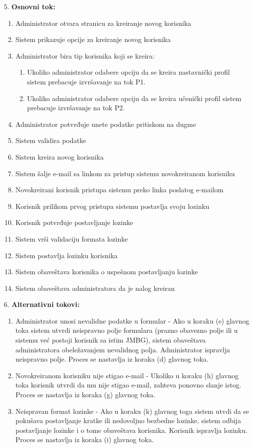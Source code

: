\documentclass{article}
\begin{document}
5. \textbf{Osnovni tok:} 
\begin{enumerate} [label=(\alph*)]
\item Administrator otvara stranicu za kreiranje novog korisnika
\item Sistem prikazuje opcije za kreiranje novog korisnika
\item Administrator bira tip korisnika koji se kreira:
\begin{enumerate} [label=(\roman*)]
    \item Ukoliko administrator odabere opciju da se kreira nastavnički profil sistem prebacuje izvršavanje na tok P1.
    \item Ukoliko administrator odabere opciju da se kreira učenički profil sistem prebacuje izvršavanje na tok P2.
\end{enumerate}
\item Administrator potvrđuje unete podatke pritiskom na dugme
\item Sistem validira podatke
\item Sistem kreira novog korisnika
\item Sistem šalje e-mail sa linkom za pristup sistemu novokreiranom korisniku
\item Novokreirani korisnik pristupa sistemu preko linka poslatog e-mailom
\item Korisnik prilikom prvog pristupa sistemu postavlja svoju lozinku
\item Korisnik potvrđuje postavljanje lozinke
\item Sistem vrši validaciju formata lozinke
\item Sistem postavlja lozinku korisnika
\item Sistem obaveštava korisnika o uspešnom postavljanju lozinke
\item Sistem obaveštava administratora da je nalog kreiran
\end{enumerate}

6. \textbf{Alternativni tokovi:}
\begin{enumerate} [label=(\roman*)]
\item Administrator unosi nevalidne podatke u formular - Ako u koraku (e) glavnog toka sistem utvrdi neispravno polje formulara (prazno obavezno polje ili u sistemu već postoji korisnik sa istim JMBG), sistem obaveštava administratora obeležavanjem nevalidnog polja. Administrator ispravlja neispravno polje. Proces se nastavlja iz koraka (d) glavnog toka.
\item Novokreiranom korisniku nije stigao e-mail - Ukoliko u koraku (h) glavnog toka korisnik utvrdi da mu nije stigao e-mail, zahteva ponovno slanje istog. Proces se nastavlja iz koraka (g) glavnog toka.
\item Neispravan format lozinke - Ako u koraku (k) glavnog toga sistem utvdi da se pokušava postavljanje kratke ili nedovoljno bezbedne lozinke, sistem odbija postavljanje lozinke i o tome obaveštava korisnika. Korisnik ispravlja lozinku. Proces se nastavlja iz koraka (i) glavnog toka.
\end{enumerate}
\end{document}
